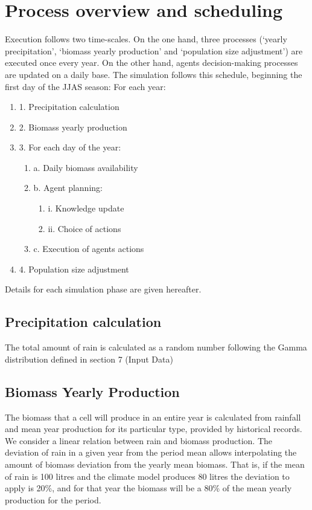 \documentclass[11pt,oneside,a4paper,openright]{report}
\begin{document}
\section{Process overview and scheduling}

Execution follows two time-scales. On the one hand, three processes (‘yearly precipitation’, ‘biomass
yearly production’ and ‘population size adjustment’) are executed once every year. On the other hand,
agents decision-making processes are updated on a daily base. The simulation follows this schedule,
beginning the first day of the JJAS season:
For each year:
\begin{enumerate}
	\item 1. Precipitation calculation
	\item 2. Biomass yearly production
	\item 3. For each day of the year:
	\begin{enumerate}
		\item a. Daily biomass availability
		\item b. Agent planning:
		\begin{enumerate}
			\item i. Knowledge update
			\item ii. Choice of actions
		\end{enumerate}
		\item c. Execution of agents actions
	\end{enumerate}
	\item 4. Population size adjustment
\end{enumerate}


Details for each simulation phase are given hereafter.


\subsection{Precipitation calculation}
The total amount of rain is calculated as a random number following the Gamma distribution defined in
section 7 (Input Data)
\subsection{Biomass Yearly Production}
The biomass that a cell will produce in an entire year is calculated from rainfall and mean year
production for its particular type, provided by historical records.
We consider a linear relation between rain and biomass production. The deviation of rain in a given
year from the period mean allows interpolating the amount of biomass deviation from the yearly mean
biomass. That is, if the mean of rain is 100 litres and the climate model produces 80 litres the deviation
to apply is 20\%, and for that year the biomass will be a 80\% of the mean yearly production for the
period.
\end{document}
